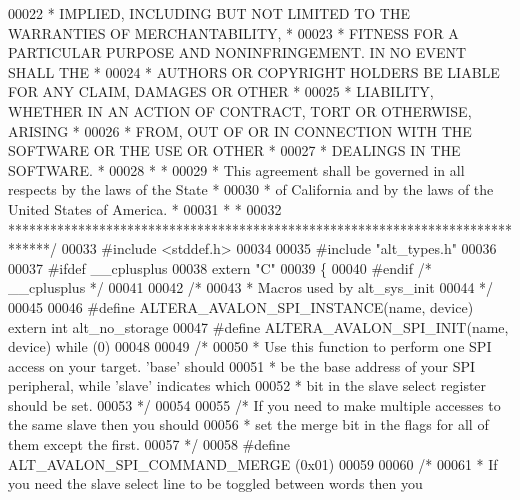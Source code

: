 \begin{DoxyCode}
00022 \textcolor{comment}{* IMPLIED, INCLUDING BUT NOT LIMITED TO THE WARRANTIES OF MERCHANTABILITY,    *}
00023 \textcolor{comment}{* FITNESS FOR A PARTICULAR PURPOSE AND NONINFRINGEMENT. IN NO EVENT SHALL THE *}
00024 \textcolor{comment}{* AUTHORS OR COPYRIGHT HOLDERS BE LIABLE FOR ANY CLAIM, DAMAGES OR OTHER      *}
00025 \textcolor{comment}{* LIABILITY, WHETHER IN AN ACTION OF CONTRACT, TORT OR OTHERWISE, ARISING     *}
00026 \textcolor{comment}{* FROM, OUT OF OR IN CONNECTION WITH THE SOFTWARE OR THE USE OR OTHER         *}
00027 \textcolor{comment}{* DEALINGS IN THE SOFTWARE.                                                   *}
00028 \textcolor{comment}{*                                                                             *}
00029 \textcolor{comment}{* This agreement shall be governed in all respects by the laws of the State   *}
00030 \textcolor{comment}{* of California and by the laws of the United States of America.              *}
00031 \textcolor{comment}{*                                                                             *}
00032 \textcolor{comment}{******************************************************************************/}
00033 \textcolor{preprocessor}{#include <stddef.h>}
00034 
00035 \textcolor{preprocessor}{#include "alt_types.h"}
00036 
00037 \textcolor{preprocessor}{#ifdef \_\_cplusplus}
00038 \textcolor{keyword}{extern} \textcolor{stringliteral}{"C"}
00039 \{
00040 \textcolor{preprocessor}{#endif }\textcolor{comment}{/* \_\_cplusplus */}\textcolor{preprocessor}{}
00041 
00042 \textcolor{comment}{/*}
00043 \textcolor{comment}{ * Macros used by alt\_sys\_init}
00044 \textcolor{comment}{ */}
00045 
00046 \textcolor{preprocessor}{#define ALTERA\_AVALON\_SPI\_INSTANCE(name, device) extern int alt\_no\_storage}
00047 \textcolor{preprocessor}{#define ALTERA\_AVALON\_SPI\_INIT(name, device) while (0)}
00048 
00049 \textcolor{comment}{/*}
00050 \textcolor{comment}{ * Use this function to perform one SPI access on your target.  'base' should}
00051 \textcolor{comment}{ * be the base address of your SPI peripheral, while 'slave' indicates which}
00052 \textcolor{comment}{ * bit in the slave select register should be set.}
00053 \textcolor{comment}{ */}
00054 
00055 \textcolor{comment}{/* If you need to make multiple accesses to the same slave then you should }
00056 \textcolor{comment}{ * set the merge bit in the flags for all of them except the first.}
00057 \textcolor{comment}{ */}
00058 \textcolor{preprocessor}{#define ALT\_AVALON\_SPI\_COMMAND\_MERGE (0x01)}
00059 
00060 \textcolor{comment}{/*}
00061 \textcolor{comment}{ * If you need the slave select line to be toggled between words then you}

\end{DoxyCode}
